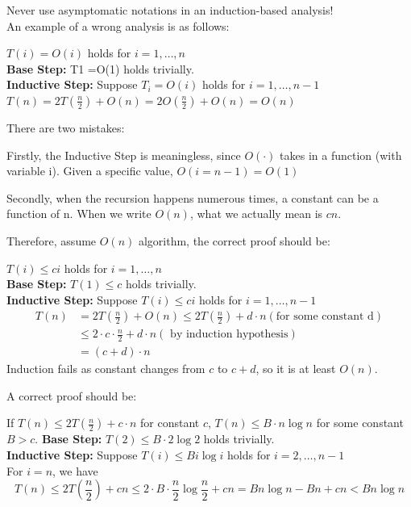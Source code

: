 \begin{remark} Never use asymptomatic notations in an induction-based analysis!\\
An example of a wrong analysis is as follows:
\begin{prf} $T(i) = O(i)$ holds for $i=1,\ldots,n$ \\
\textbf{Base Step:} T1 =O(1) holds trivially.\\
\textbf{Inductive Step:} Suppose $T_i=O(i)$ holds for $i=1,\ldots,n-1$ \\
$T(n)=2T(\frac{n}{2})+O(n)=2O(\frac{n}{2})+O(n)=O(n)$ 
\end{prf}
There are two mistakes:

Firstly, the Inductive Step is meaningless, since $O(\cdot)$ takes in a function (with variable i). Given a specific value, $O(i=n-1)=O(1)$

Secondly, when the recursion happens numerous times, a constant can be a function of n. When we write $O(n)$, what we actually mean is $cn$.

Therefore, assume $O(n)$ algorithm, the correct proof should be:
\begin{prf} 
    $T(i) \leq ci$ holds for $i=1,\ldots,n$ \\
    \textbf{Base Step:} $T(1) \leq c$ holds trivially.\\
    \textbf{Inductive Step:} Suppose $T(i) \leq ci$ holds for $i=1,\ldots,n-1$ \\
    \[
    \begin{aligned}
    T(n)&=2T(\frac{n}{2})+O(n) \leq 2T(\frac{n}{2})+d\cdot n (\text{for some constant d})\\
    &\leq 2\cdot c\cdot \frac{n}{2}+d\cdot n (\text{ by induction hypothesis})\\
    &=(c+d)\cdot n
    \end{aligned}
    \]
    Induction fails as constant changes from $c$ to $c+d$, so it is at least $O(n)$.
\end{prf}
A correct proof should be:
\begin{prf}
    If $T(n) \leq 2T(\frac{n}{2})+c\cdot n$ for constant $c$, $T(n) \leq B \cdot n\log n$ for some constant \textbf{$B>c$}.
    \textbf{Base Step:} $T(2) \leq B\cdot 2\log 2$ holds trivially.\\
    \textbf{Inductive Step:} Suppose $T(i) \leq Bi\log i$ holds for $i=2,\ldots,n-1$ \\
    For $i=n$, we have\\
    \[
        T(n)\leq 2T(\frac{n}{2})+cn \leq 2\cdot B\cdot \frac{n}{2} \log \frac{n}{2}+cn=Bn \log n -Bn+cn < Bn \log n \]
\end{prf}
\end{remark}

